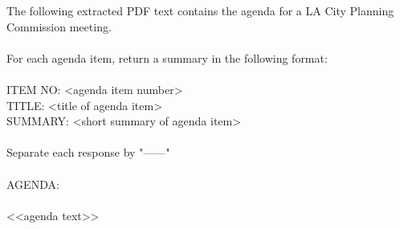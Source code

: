 The following extracted PDF text contains the agenda for a LA City Planning Commission meeting. \\ 
\\ 
For each agenda item, return a summary in the following format:\\ 
\\ 
ITEM NO: <agenda item number>\\ 
TITLE: <title of agenda item>\\ 
SUMMARY: <short summary of agenda item>\\ 
\\ 
Separate each response by "------"\\ 
\\ 
AGENDA:\\ 
\\ 
<<agenda text>>